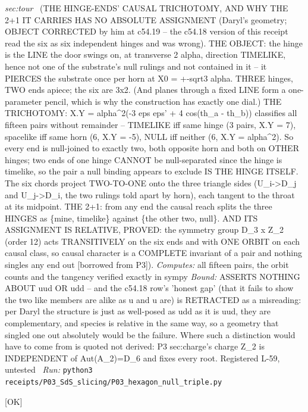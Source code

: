 \begin{description}
\textit{sec:tour} \ (THE HINGE-ENDS' CAUSAL TRICHOTOMY, AND WHY THE 2+1 IT CARRIES HAS NO ABSOLUTE ASSIGNMENT (Daryl's geometry; OBJECT CORRECTED by him at c54.19 -- the c54.18 version of this receipt read the six as six independent hinges and was wrong). THE OBJECT: the hinge is the LINE the door swings on, at transverse 2 alpha, direction TIMELIKE, hence not one of the substrate's null rulings and not contained in it -- it PIERCES the substrate once per horn at X0 = +-sqrt3 alpha. THREE hinges, TWO ends apiece; the six are 3x2. (And planes through a fixed LINE form a one-parameter pencil, which is why the construction has exactly one dial.) THE TRICHOTOMY: X.Y = alpha\textasciicircum{}2(-3 eps eps' + 4 cos(th\_a - th\_b)) classifies all fifteen pairs without remainder -- TIMELIKE iff same hinge (3 pairs, X.Y = 7), spacelike iff same horn (6, X.Y = -5), NULL iff neither (6, X.Y = alpha\textasciicircum{}2). So every end is null-joined to exactly two, both opposite horn and both on OTHER hinges; two ends of one hinge CANNOT be null-separated since the hinge is timelike, so the pair a null binding appears to exclude IS THE HINGE ITSELF. The six chords project TWO-TO-ONE onto the three triangle sides (U\_i->D\_j and U\_j->D\_i, the two rulings told apart by horn), each tangent to the throat at its midpoint. THE 2+1: from any end the causal reach splits the three HINGES as \{mine, timelike\} against \{the other two, null\}. AND ITS ASSIGNMENT IS RELATIVE, PROVED: the symmetry group D\_3 x Z\_2 (order 12) acts TRANSITIVELY on the six ends and with ONE ORBIT on each causal class, so causal character is a COMPLETE invariant of a pair and nothing singles any end out [borrowed from P3]). 
\emph{Computes:} all fifteen pairs, the orbit counts and the tangency verified exactly in sympy
 \emph{Bound:} ASSERTS NOTHING ABOUT uud OR udd -- and the c54.18 row's 'honest gap' (that it fails to show the two like members are alike as u and u are) is RETRACTED as a misreading: per Daryl the structure is just as well-posed as udd as it is uud, they are complementary, and species is relative in the same way, so a geometry that singled one out absolutely would be the failure. Where such a distinction would have to come from is quoted not derived: P3 sec:charge's charge Z\_2 is INDEPENDENT of Aut(A\_2)=D\_6 and fixes every root. Registered L-59, untested
\ \emph{Run:} \texttt{python3 receipts/P03\_SdS\_slicing/P03\_hexagon\_null\_triple.py}
\item[\label{rcpt:Y12_the_heavy_right_handed_neutrino_must_decay_before_nucleosynthesis_and_that_puts_a_floor_on_the_right_handed_scale}\textbf{}\quad\texttt{Y12\_the\_heavy\_right\_handed\_neutrino\_must\_decay\_before\_nucleosynthesis\_and\_that\_puts\_a\_floor\_on\_the\_right\_handed\_scale}]\hfill\textsf{[OK]}\\

\end{description}
